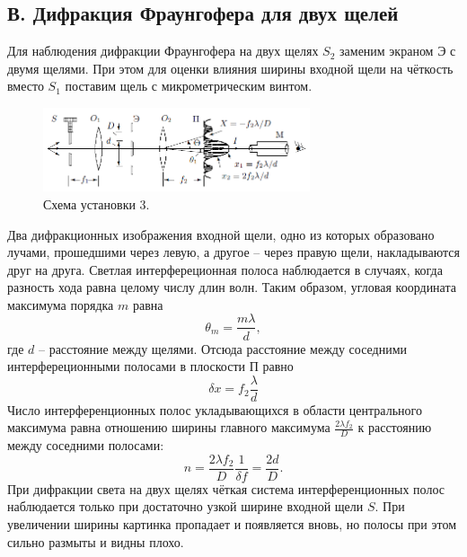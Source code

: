 \documentclass{article}
\begin{document}
\subsection*{В. Дифракция Фраунгофера для двух щелей}
Для наблюдения дифракции Фраунгофера на двух щелях $S_2$ заменим экраном Э с двумя щелями. При этом для оценки влияния ширины входной щели на чёткость вместо $S_1$ поставим щель с микрометрическим винтом.
\begin{figure}[h!]
	\includegraphics[width = 0.7\textwidth]{4.png}
	\centering
	\caption{Схема установки 3.}
\end{figure}
Два дифракционных изображения входной щели, одно из которых образовано лучами, прошедшими через левую, а другое -- через правую щели, накладываются друг на друга.
Светлая интерфереционная полоса наблюдается в случаях, когда разность хода равна целому числу длин волн. Таким образом, угловая координата максимума порядка $m$ равна
\begin{equation}
\theta_m = \dfrac{m \lambda}{d},
\end{equation}
где $d$ -- расстояние между щелями. Отсюда расстояние между соседними интерфереционными полосами в плоскости П равно
\begin{equation}
\delta x = f_2 \dfrac{\lambda}{d}
\end{equation}
Число интерференционных полос укладывающихся в области центрального максимума равна отношению ширины главного максимума $\frac{2\lambda f_2}{D}$ к расстоянию между соседними полосами:
\begin{equation}
n = \dfrac{2\lambda f_2}{D} \dfrac{1}{\delta f}= \dfrac{2d}{D}.
\end{equation}
При дифракции света на двух щелях чёткая система интерференционных полос наблюдается только при достаточно узкой ширине входной щели $S$. При увеличении ширины картинка пропадает и появляется вновь, но полосы при этом сильно размыты и видны плохо.
\end{document}
